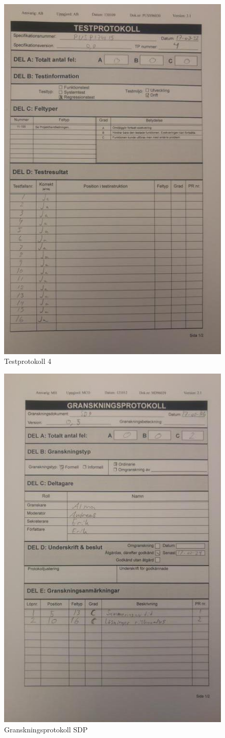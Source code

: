 \documentclass[paper=a4, fontsize=11pt,twoside]{article}
\begin{document}
\begin{figure}[h]
\centering
\includegraphics[width=0.65\linewidth]{test4.jpg}
\caption{Testprotokoll 4}
\label{fig:20170322135632}
\end{figure}

\begin{figure}[h]
\centering
\includegraphics[width=0.65\linewidth]{SDP.jpg}
\caption{Granskningsprotokoll SDP}
\label{fig:20170322135626}
\end{figure}
\end{document}
